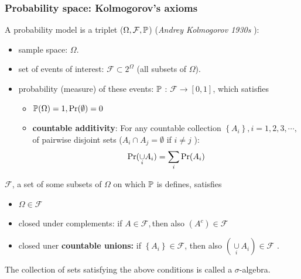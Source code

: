 \documentclass[english,10pt,handout]{beamer}
\begin{document}
\begin{frame}
\frametitle{Probability space:  Kolmogorov's axioms  }
A probability model is a  triplet ($\Omega, \mathcal{F},\mathbb{P}$) ({\it Andrey Kolmogorov 1930s }):
\begin{itemize}
\item sample space: $\Omega$.
\item set of events of interest: $\mathcal{F}\subset2^{\Omega}$ (all subsets of $\Omega$).
\item probability (measure) of these events: $\mathbb{P}$ : $\mathcal{F}\to[0,1]$, which satisfies 

\pause
\begin{itemize}
\item $\mathbb{P}(\Omega)=1,{\Pr}(\emptyset)=0$
\item \textbf{countable additivity}: For any countable collection $\left\{ A_{i}\right\} ,i=1,2,3,\cdots,$
of pairwise disjoint sets ($A_{i}\cap A_{j}=\emptyset$ if $i\neq j$
):
\[
{\Pr}(\underset{i}{\cup}A_{i})=\sum_{i}{\Pr}(A_{i})
\]
\end{itemize}
\end{itemize}





\pause
$\mathcal{F}$, a set
of some subsets of $\Omega$ on which $\mathbb{P}$ is defines, satisfies
\begin{itemize}
\item $\Omega\in\mathcal{F}$
\item closed under complements: if $A\in\mathcal{F},$then also $(A^c)\in\mathcal{F}$
\item closed uner \textbf{countable unions: }if $ $$\left\{ A_{i}\right\} \in\mathcal{F}$,
then also $(\underset{i}{\cup}A_{i})\in\mathcal{F}$ .
\end{itemize}
\pause 
The collection of sets satisfying the above conditions is called a $\sigma$-algebra.
\end{frame}
\end{document}
